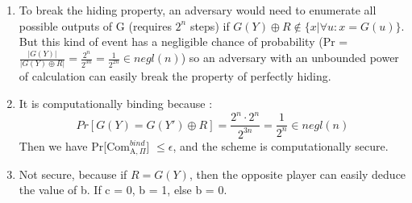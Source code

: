 \begin{solution}
\begin{enumerate}
    \item To break the hiding property, an adversary would need to enumerate all possible outputs of G (requires $2^n$ steps) if $G(Y) \oplus R \notin \{x | \forall u : x = G(u)\}$. But this kind of event has a negligible chance of probability (Pr = $\frac{|G(Y)|}{|G(Y) \oplus R|} = \frac{2^n}{2^{3n}} = \frac{1}{2^{2n}} \in negl(n)$) so an adversary with an unbounded power of calculation can easily break the property of perfectly hiding.
    \item It is computationally binding because : 
    $$Pr[G(Y) = G(Y') \oplus R] = \frac{2^n\cdot2^n}{2^{3n}} = \frac{1}{2^n} \in negl(n)$$
    Then we have Pr[Com$^{bind}_{\mathrm{A}, \Pi}$] $\leq \epsilon$, and the scheme is computationally secure. 
    \item Not secure, because if $R = G(Y)$, then the opposite player can easily deduce the value of b. If c = 0, b = 1, else b = 0. 
\end{enumerate}
\end{solution}